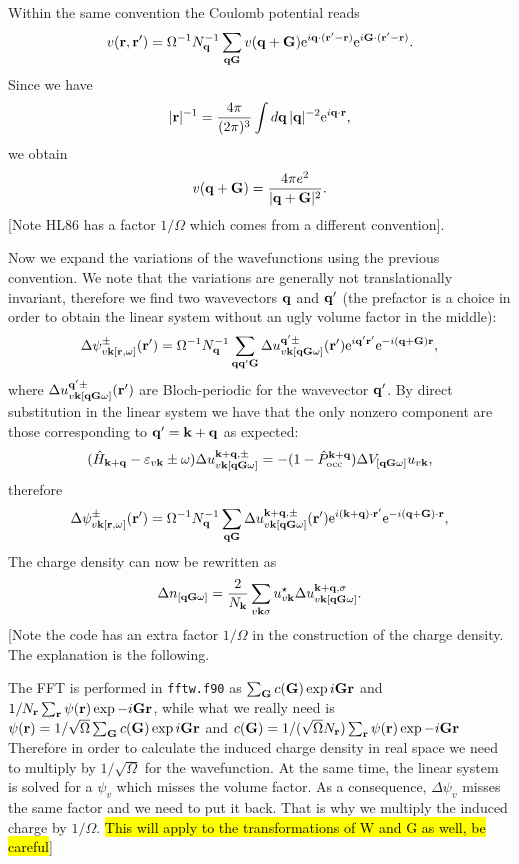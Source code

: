 \documentclass[twocolumn,prb,showpacs,superscriptaddress]{revtex4}
\def\w{\omega}
\def\H{\hat{H}}
\def\P{\hat{P}_{\rm occ}}
\def\E{\varepsilon}
\def\q{{\bf q}}
\def\s{\sigma}
\def\k{{\bf k}}
\def\qp{{\bf q^\prime}}
\def\G{{\bf G}}
\def\r{{\bf r}}
\def\rp{{\bf r^\prime}}
\begin{document}
Within the same convention the Coulomb potential reads
  \begin{equation}
  v(\r,\rp)  =  \Omega^{-1}N_\q^{-1} \sum_{\q\G} v(\q+\G) {\rm e}^{i\q\cdot(\rp-\r)} {\rm e}^{i\G\cdot(\rp-\r)}. 
  \end{equation}
Since we have
  \begin{equation}
  |\r|^{-1} = \frac{4\pi}{(2\pi)^3}\int d\q \, |\q|^{-2}{\rm e}^{i\q\cdot\r},
  \end{equation}
we obtain
  \begin{equation}
  v(\q+\G) = \frac{4\pi e^2}{|\q+\G|^2}.
  \end{equation}
[Note HL86 has a factor $1/\Omega$ which comes from a different convention].

Now we expand the variations of the wavefunctions using the previous convention.
We note that the variations are generally not translationally invariant, therefore
we find two wavevectors $\q$ and $\qp$ (the prefactor is a choice in order to
obtain the linear system without an ugly volume factor in the middle):
  \begin{equation}
  \Delta \psi^\pm_{v\k[\r,\w]} (\rp) = \Omega^{-1}N_\q^{-1}\sum_{\q\qp\G} \Delta u^{\qp\pm}_{v\k[\q\G\w]} (\rp) 
  {\rm e}^{i\qp\rp} {\rm e}^{-i(\q+\G)\r}, 
  \end{equation}
where $\Delta u^{\qp\pm}_{v\k[\q\G\w]} (\rp)$ are Bloch-periodic for the wavevector $\qp$.
By direct substitution in the linear system we have that the only nonzero component
are those corresponding to $\qp=\k+\q$ as expected:
  \begin{equation}
  (\H_{\k+\q}-\E_{v\k}\pm\w) \Delta u^{\k+\q,\pm}_{v\k[\q\G\w]}  = -(1-\P^{\k+\q}) \Delta V_{[\q\G\w]} u_{v\k},
  \end{equation}
therefore
  \begin{equation}
  \Delta \psi^\pm_{v\k[\r,\w]} (\rp) = \Omega^{-1}N_\q^{-1} \sum_{\q\G} \Delta u^{\k+\q,\pm}_{v\k[\q\G\w]} (\rp)
  {\rm e}^{i(\k+\q)\cdot\rp} {\rm e}^{-i(\q+\G)\cdot\r},
  \end{equation}
The charge density can now be rewritten as 
  \begin{equation}
  \Delta n_{[\q\G\w]} = \frac{2}{N_\k}\sum_{v\k\s} u_{v\k}^\star  \Delta u^{\k+\q,\s}_{v\k[\q\G\w]}.
  \end{equation}
[Note the code has an extra factor $1/\Omega$ in the construction of the
charge density. The explanation is the following.

The FFT is performed in {\tt fftw.f90} as $\sum_\G c(\G) \exp{i\G\r}$
and $1/N_\r \sum_\r \psi(\r) \exp{-i\G\r}$, while what we really need 
is $\psi(\r) = 1/\sqrt{\Omega}\sum_\G c(\G) \exp{i\G\r}$
and $c(\G) = 1/(\sqrt{\Omega} N_\r) \sum_\r \psi(\r) \exp{-i\G\r}$
Therefore in order to calculate the induced charge density
in real space we need to multiply by $1/\sqrt{\Omega}$ for the
wavefunction. At the same time, the linear system is solved
for a $\psi_v$ which misses the volume factor. As a consequence,
$\Delta\psi_v$ misses the same factor and we need to put it back.
That is why we multiply the induced charge by $1/\Omega$.
\hl{ This will apply to the transformations of W and G as well, be careful}]
\end{document}
